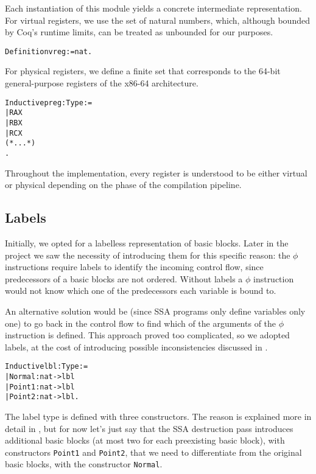 Each instantiation of this module yields a concrete intermediate representation. For virtual registers, we use the set of natural numbers, which, although bounded by Coq's runtime limits, can be treated as unbounded for our purposes.

\begin{alltt}
Definition vreg := nat.
\end{alltt}

For physical registers, we define a finite set that corresponds to the 64-bit general-purpose registers of the x86-64 architecture.

\begin{alltt}
Inductive preg : Type :=
  | RAX
  | RBX
  | RCX
  (* ... *)
.
\end{alltt}

Throughout the implementation, every register is understood to be either virtual or physical depending on the phase of the compilation pipeline.

\subsection{Labels}

Initially, we opted for a labelless representation of basic blocks.
Later in the project we saw the necessity of introducing them for this specific reason: the $\phi$ instructions require labels to identify the incoming control flow, since predecessors of a basic blocks are not ordered. Without labels a $\phi$ instruction would not know which one of the predecessors each variable is bound to.

An alternative solution would be (since SSA programs only define variables only one) to go back in the control flow to find which of the arguments of the $\phi$ instruction is defined. This approach proved too complicated, so we adopted labels, at the cost of introducing possible inconsistencies discussed in .

\begin{alltt}
Inductive lbl : Type :=
  | Normal : nat -> lbl
  | Point1 : nat -> lbl
  | Point2 : nat -> lbl.
\end{alltt}

The label type is defined with three constructors. The reason is explained more in detail in , but for now let's just say that the SSA destruction pass introduces additional basic blocks (at most two for each preexisting basic block), with constructors \texttt{Point1} and \texttt{Point2}, that we need to differentiate from the original basic blocks, with the constructor \texttt{Normal}.

